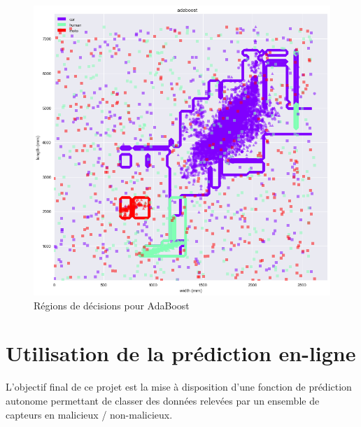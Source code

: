 \documentclass[a4paper]{report}
\begin{document}
\begin{figure}
\centering
\includegraphics[width=\textwidth]{img/adaboost_contour.png}
\caption{Régions de décisions pour AdaBoost\label{fig:adaboost_contour}}
\end{figure}

\section{Utilisation de la prédiction en-ligne}

L'objectif final de ce projet est la mise à disposition d'une fonction de prédiction autonome permettant de classer des données relevées par un ensemble de capteurs en malicieux / non-malicieux.
\end{document}
